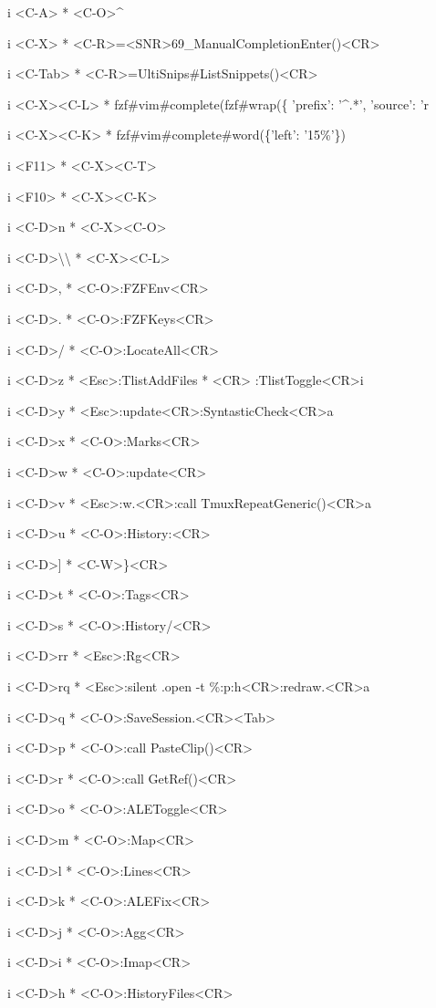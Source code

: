 \documentclass[11pt,a4paper,twoside]{book}
\begin{document}
i  <C-A>  * <C-O>\textasciicircum{}

i  <C-X>  * <C-R>=<SNR>69\_ManualCompletionEnter()<CR>

i  <C-Tab>  * <C-R>=UltiSnips\#ListSnippets()<CR>

i  <C-X><C-L>  * fzf\#vim\#complete(fzf\#wrap(\{ 'prefix': '\textasciicircum{}.*', 'source': 'r

i  <C-X><C-K>  * fzf\#vim\#complete\#word(\{'left': '15\%'\})

i  <F11>  * <C-X><C-T>

i  <F10>  * <C-X><C-K>

i  <C-D>n  * <C-X><C-O>

i  <C-D>\textbackslash{}\textbackslash{}  * <C-X><C-L>

i  <C-D>,  * <C-O>:FZFEnv<CR>

i  <C-D>.  * <C-O>:FZFKeys<CR>

i  <C-D>/  * <C-O>:LocateAll<CR>

i  <C-D>z  * <Esc>:TlistAddFiles * <CR> :TlistToggle<CR>i

i  <C-D>y  * <Esc>:update<CR>:SyntasticCheck<CR>a

i  <C-D>x  * <C-O>:Marks<CR>

i  <C-D>w  * <C-O>:update<CR>

i  <C-D>v  * <Esc>:w.<CR>:call TmuxRepeatGeneric()<CR>a

i  <C-D>u  * <C-O>:History:<CR>

i  <C-D>]  * <C-W>\}<CR>

i  <C-D>t  * <C-O>:Tags<CR>

i  <C-D>s  * <C-O>:History/<CR>

i  <C-D>rr  * <Esc>:Rg<CR>

i  <C-D>rq  * <Esc>:silent .open -t \%:p:h<CR>:redraw.<CR>a

i  <C-D>q  * <C-O>:SaveSession.<CR><Tab>

i  <C-D>p  * <C-O>:call PasteClip()<CR>

i  <C-D>r  * <C-O>:call GetRef()<CR>

i  <C-D>o  * <C-O>:ALEToggle<CR>

i  <C-D>m  * <C-O>:Map<CR>

i  <C-D>l  * <C-O>:Lines<CR>

i  <C-D>k  * <C-O>:ALEFix<CR>

i  <C-D>j  * <C-O>:Agg<CR>

i  <C-D>i  * <C-O>:Imap<CR>

i  <C-D>h  * <C-O>:HistoryFiles<CR>
\end{document}
